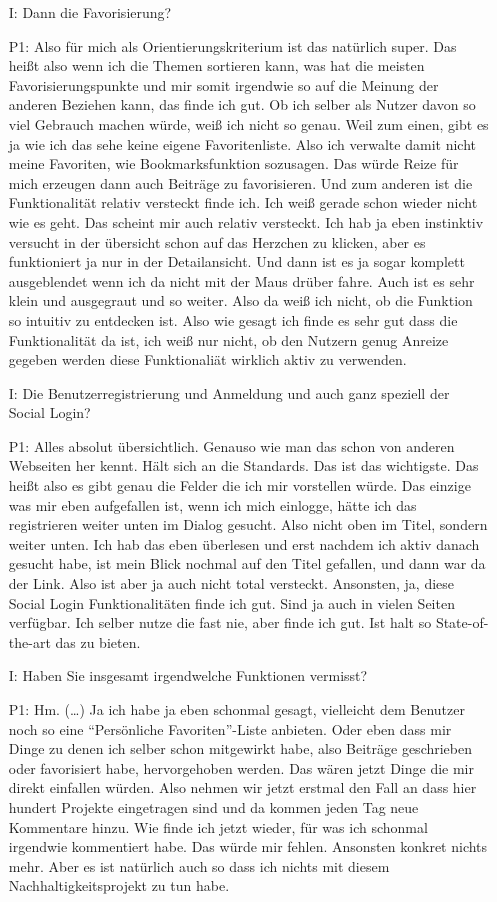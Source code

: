 \begin{itemize}
    \item[I:] Dann die Favorisierung?
    \item[P1:] Also f{\"u}r mich als Orientierungskriterium ist das nat{\"u}rlich super. Das hei{\ss}t also wenn ich die Themen sortieren kann, was hat die meisten Favorisierungspunkte und mir somit irgendwie so auf die Meinung der anderen Beziehen kann, das finde ich gut. Ob ich selber als Nutzer davon so viel Gebrauch machen w{\"u}rde, wei{\ss} ich nicht so genau. Weil zum einen, gibt es ja wie ich das sehe keine eigene Favoritenliste. Also ich verwalte damit nicht meine Favoriten, wie Bookmarksfunktion sozusagen. Das w{\"u}rde Reize f{\"u}r mich erzeugen dann auch Beitr{\"a}ge zu favorisieren. Und zum anderen ist die Funktionalit{\"a}t relativ versteckt finde ich. Ich wei{\ss} gerade schon wieder nicht wie es geht. Das scheint mir auch relativ versteckt. Ich hab ja eben instinktiv versucht in der {\"u}bersicht schon auf das Herzchen zu klicken, aber es funktioniert ja nur in der Detailansicht. Und dann ist es ja sogar komplett ausgeblendet wenn ich da nicht mit der Maus dr{\"u}ber fahre. Auch ist es sehr klein und ausgegraut und so weiter. Also da wei{\ss} ich nicht, ob die Funktion so intuitiv zu entdecken ist. Also wie gesagt ich finde es sehr gut dass die Funktionalit{\"a}t da ist, ich wei{\ss} nur nicht, ob den Nutzern genug Anreize gegeben werden diese Funktionali{\"a}t wirklich aktiv zu verwenden.
    \item[I:] Die Benutzerregistrierung und Anmeldung und auch ganz speziell der Social Login?
    \item[P1:] Alles absolut {\"u}bersichtlich. Genauso wie man das schon von anderen Webseiten her kennt. H{\"a}lt sich an die Standards. Das ist das wichtigste. Das hei{\ss}t also es gibt genau die Felder die ich mir vorstellen w{\"u}rde. Das einzige was mir eben aufgefallen ist, wenn ich mich einlogge, h{\"a}tte ich das registrieren weiter unten im Dialog gesucht. Also nicht oben im Titel, sondern weiter unten. Ich hab das eben {\"u}berlesen und erst nachdem ich aktiv danach gesucht habe, ist mein Blick nochmal auf den Titel gefallen, und dann war da der Link. Also ist aber ja auch nicht total versteckt. Ansonsten, ja, diese Social Login Funktionalit{\"a}ten finde ich gut. Sind ja auch in vielen Seiten verf{\"u}gbar. Ich selber nutze die fast nie, aber finde ich gut. Ist halt so State-of-the-art das zu bieten.
    \item[I:] Haben Sie insgesamt irgendwelche Funktionen vermisst?
    \item[P1:] Hm. (\dots) Ja ich habe ja eben schonmal gesagt, vielleicht dem Benutzer noch so eine "`Pers{\"o}nliche Favoriten"'-Liste anbieten. Oder eben dass mir Dinge zu denen ich selber schon mitgewirkt habe, also Beitr{\"a}ge geschrieben oder favorisiert habe, hervorgehoben werden. Das w{\"a}ren jetzt Dinge die mir direkt einfallen w{\"u}rden. Also nehmen wir jetzt erstmal den Fall an dass hier hundert Projekte eingetragen sind und da kommen jeden Tag neue Kommentare hinzu. Wie finde ich jetzt wieder, f{\"u}r was ich schonmal irgendwie kommentiert habe. Das w{\"u}rde mir fehlen. Ansonsten konkret nichts mehr. Aber es ist nat{\"u}rlich auch so dass ich nichts mit diesem Nachhaltigkeitsprojekt zu tun habe.

\end{itemize}
